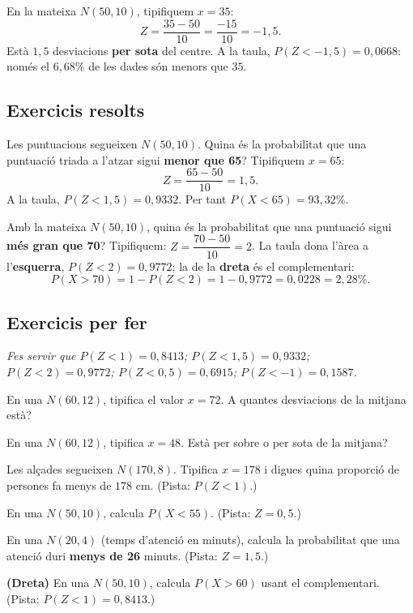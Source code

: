 \begin{exemple}
En la mateixa $N(50,10)$, tipifiquem $x=35$:
\[
Z=\frac{35-50}{10}=\frac{-15}{10}=-1,5.
\]
Està $1,5$ desviacions \textbf{per sota} del centre. A la taula, $P(Z<-1,5)=0,0668$:
només el $6,68\%$ de les dades són menors que $35$.
\end{exemple}

\subsection{Exercicis resolts}

\begin{exresolt}
Les puntuacions segueixen $N(50,10)$. Quina és la probabilitat que una puntuació triada a
l'atzar sigui \textbf{menor que 65}?
\solucio
Tipifiquem $x=65$:
\[
Z=\frac{65-50}{10}=1,5.
\]
A la taula, $P(Z<1,5)=0,9332$. Per tant $P(X<65)=93,32\%$.
\end{exresolt}

\begin{exresolt}
Amb la mateixa $N(50,10)$, quina és la probabilitat que una puntuació sigui \textbf{més
gran que 70}?
\solucio
Tipifiquem: $Z=\dfrac{70-50}{10}=2$. La taula dona l'àrea a l'\textbf{esquerra},
$P(Z<2)=0,9772$; la de la \textbf{dreta} és el complementari:
\[
P(X>70)=1-P(Z<2)=1-0,9772=0,0228=2,28\%.
\]
\end{exresolt}

\subsection{Exercicis per fer}

\noindent\textit{Fes servir que $P(Z<1)=0,8413$; $P(Z<1,5)=0,9332$; $P(Z<2)=0,9772$;
$P(Z<0,5)=0,6915$; $P(Z<-1)=0,1587$.}

\begin{exercicis}
\begin{exlist}
  \item En una $N(60,12)$, tipifica el valor $x=72$. A quantes desviacions de la mitjana
        està?
  \item En una $N(60,12)$, tipifica $x=48$. Està per sobre o per sota de la mitjana?
  \item Les alçades segueixen $N(170,8)$. Tipifica $x=178$ i digues quina proporció de
        persones fa menys de $178$ cm. (Pista: $P(Z<1)$.)
  \item En una $N(50,10)$, calcula $P(X<55)$. (Pista: $Z=0,5$.)
  \item En una $N(20,4)$ (temps d'atenció en minuts), calcula la probabilitat que una
        atenció duri \textbf{menys de 26} minuts. (Pista: $Z=1,5$.)
  \item \textbf{(Dreta)} En una $N(50,10)$, calcula $P(X>60)$ usant el complementari.
        (Pista: $P(Z<1)=0,8413$.)
\end{exlist}
\end{exercicis}

